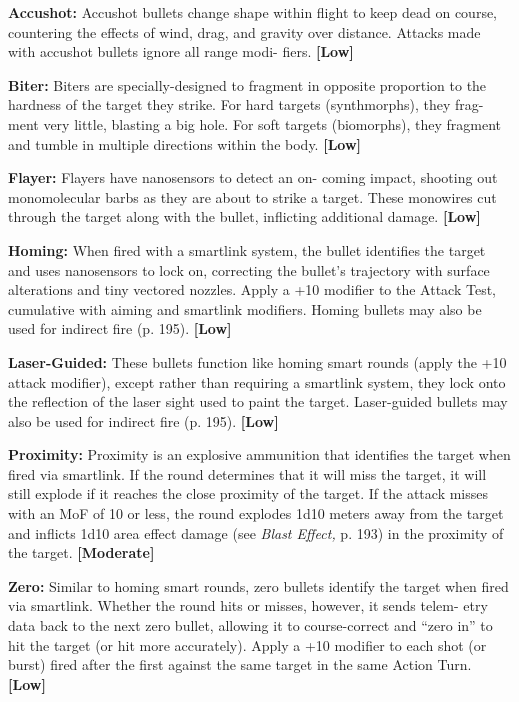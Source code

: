 \textbf{Accushot:} Accushot bullets change shape within 
flight to keep dead on course, countering the effects 
of wind, drag, and gravity over distance. Attacks 
made with accushot bullets ignore all range modi-
fiers. \textbf{[Low]}

\textbf{Biter:} Biters are specially-designed to fragment in 
opposite proportion to the hardness of the target they 
strike. For hard targets (synthmorphs), they frag-
ment very little, blasting a big hole. For soft targets 
(biomorphs), they fragment and tumble in multiple 
directions within the body. \textbf{[Low]}

\textbf{Flayer:} Flayers have nanosensors to detect an on-
coming impact, shooting out monomolecular barbs 
as they are about to strike a target. These monowires 
cut through the target along with the bullet, inflicting 
additional damage. \textbf{[Low]}

\textbf{Homing:} When fired with a smartlink system, the 
bullet identifies the target and uses nanosensors to 
lock on, correcting the bullet's trajectory with surface 
alterations and tiny vectored nozzles. Apply a +10 
modifier to the Attack Test, cumulative with aiming 
and smartlink modifiers. Homing bullets may also be 
used for indirect fire (p. 195). \textbf{[Low]}

\textbf{Laser-Guided:} These bullets function like homing 
smart rounds (apply the +10 attack modifier), except 
rather than requiring a smartlink system, they lock 
onto the reflection of the laser sight used to paint 
the target. Laser-guided bullets may also be used for 
indirect fire (p. 195). \textbf{[Low]}

\textbf{Proximity:} Proximity is an explosive ammunition 
that identifies the target when fired via smartlink. If 
the round determines that it will miss the target, it will 
still explode if it reaches the close proximity of the 
target. If the attack misses with an MoF of 10 or less, 
the round explodes 1d10 meters away from the target 
and inflicts 1d10 area effect damage (see \textit{Blast Effect,}
p. 193) in the proximity of the target. \textbf{[Moderate]}

\textbf{Zero:} Similar to homing smart rounds, zero bullets 
identify the target when fired via smartlink. Whether 
the round hits or misses, however, it sends telem-
etry data back to the next zero bullet, allowing it to 
course-correct and ``zero in'' to hit the target (or hit 
more accurately). Apply a +10 modifier to each shot 
(or burst) fired after the first against the same target in 
the same Action Turn. \textbf{[Low]}

